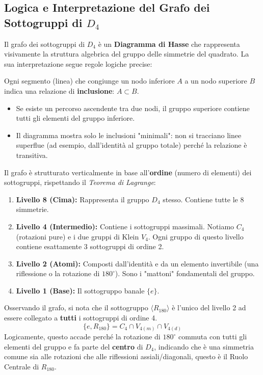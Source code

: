 \subsection{Logica e Interpretazione del Grafo dei Sottogruppi di $D_4$}
Il grafo dei sottogruppi di $D_4$ è un \textbf{Diagramma di Hasse} che rappresenta visivamente la struttura algebrica del gruppo delle simmetrie del quadrato.
La sua interpretazione segue regole logiche precise:

Ogni segmento (linea) che congiunge un nodo inferiore $A$ a un nodo superiore $B$ indica una relazione di \textbf{inclusione}: $A \subset B$. 
\begin{itemize}
  \item Se esiste un percorso ascendente tra due nodi, il gruppo superiore contiene tutti gli elementi del gruppo inferiore.
  \item Il diagramma mostra solo le inclusioni "minimali": non si tracciano linee superflue (ad esempio, dall'identità al gruppo totale) perché la relazione è transitiva.
\end{itemize}

Il grafo è strutturato verticalmente in base all'\textbf{ordine} (numero di elementi) dei sottogruppi, rispettando il \textit{Teorema di Lagrange}:
\begin{enumerate}
  \item \textbf{Livello 8 (Cima):} Rappresenta il gruppo $D_4$ stesso. Contiene tutte le 8 simmetrie.
  \item \textbf{Livello 4 (Intermedio):} Contiene i sottogruppi massimali. Notiamo $C_4$ (rotazioni pure) e i due gruppi di Klein $V_4$. Ogni gruppo di questo livello contiene esattamente 3 sottogruppi di ordine 2.
  \item \textbf{Livello 2 (Atomi):} Composti dall'identità e da un elemento invertibile (una riflessione o la rotazione di $180^\circ$). Sono i "mattoni" fondamentali del gruppo.
  \item \textbf{Livello 1 (Base):} Il sottogruppo banale $\{e\}$.
\end{enumerate}

Osservando il grafo, si nota che il sottogruppo $\langle R_{180} \rangle$ è l'unico del livello 2 ad essere collegato a \textbf{tutti} i sottogruppi di ordine 4. 
\[
\{e, R_{180}\} = C_4 \cap V_{4(m)} \cap V_{4(d)}
\]
Logicamente, questo accade perché la rotazione di $180^\circ$ commuta con tutti gli elementi del gruppo e fa parte del \textbf{centro} di $D_4$,
indicando che è una simmetria comune sia alle rotazioni che alle riflessioni assiali/diagonali, questo è il Ruolo Centrale di $R_{180}$.

